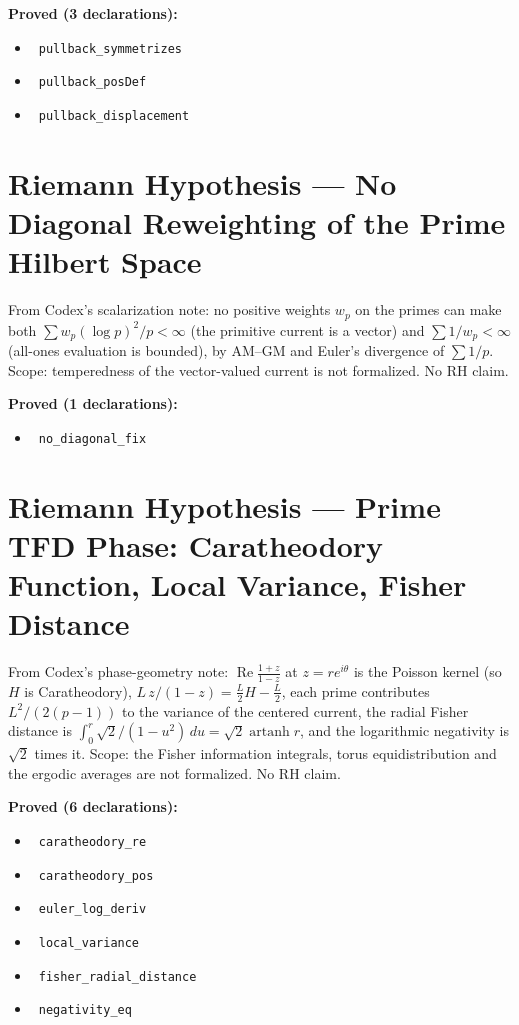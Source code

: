 \documentclass{report}
\theoremstyle{definition}
\begin{document}
\noindent\textbf{Proved (3 declarations):}
\begin{itemize}
  \item {}\leanok\ \texttt{pullback\_symmetrizes}
  \item {}\leanok\ \texttt{pullback\_posDef}
  \item {}\leanok\ \texttt{pullback\_displacement}
\end{itemize}

\section{Riemann Hypothesis --- No Diagonal Reweighting of the Prime Hilbert Space}
From Codex's scalarization note: no positive weights $w_p$ on the primes can make both $\sum w_p(\log p)^2/p<\infty$ (the primitive current is a vector) and $\sum 1/w_p<\infty$ (all-ones evaluation is bounded), by AM--GM and Euler's divergence of $\sum 1/p$. Scope: temperedness of the vector-valued current is not formalized. No RH claim.

\noindent\textbf{Proved (1 declarations):}
\begin{itemize}
  \item {}\leanok\ \texttt{no\_diagonal\_fix}
\end{itemize}

\section{Riemann Hypothesis --- Prime TFD Phase: Caratheodory Function, Local Variance, Fisher Distance}
From Codex's phase-geometry note: $\operatorname{Re}\frac{1+z}{1-z}$ at $z=re^{i\theta}$ is the Poisson kernel (so $H$ is Caratheodory), $L\,z/(1-z)=\tfrac L2H-\tfrac L2$, each prime contributes $L^2/(2(p-1))$ to the variance of the centered current, the radial Fisher distance is $\int_0^r\sqrt2/(1-u^2)\,du=\sqrt2\operatorname{artanh}r$, and the logarithmic negativity is $\sqrt2$ times it. Scope: the Fisher information integrals, torus equidistribution and the ergodic averages are not formalized. No RH claim.

\noindent\textbf{Proved (6 declarations):}
\begin{itemize}
  \item {}\leanok\ \texttt{caratheodory\_re}
  \item {}\leanok\ \texttt{caratheodory\_pos}
  \item {}\leanok\ \texttt{euler\_log\_deriv}
  \item {}\leanok\ \texttt{local\_variance}
  \item {}\leanok\ \texttt{fisher\_radial\_distance}
  \item {}\leanok\ \texttt{negativity\_eq}
\end{itemize}
\end{document}
